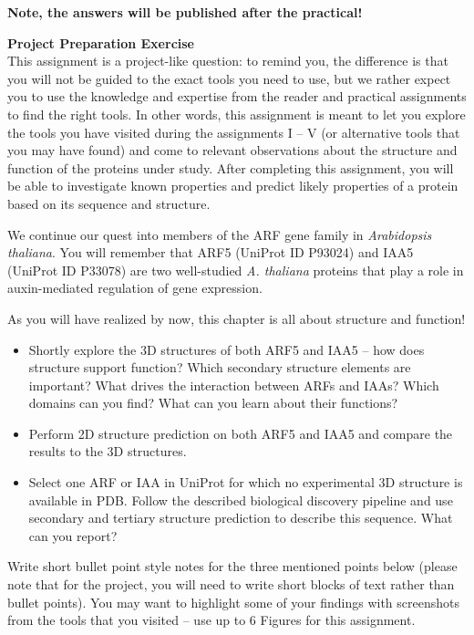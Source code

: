 \textbf{Note, the answers will be published after the practical!}

\begin{framed}
\textbf{\textbf{Project Preparation Exercise}}\\
This assignment is a project-like question: to remind you, the difference is that you will not be guided to the exact tools you need to use, but we rather expect you to use the knowledge and expertise from the reader and practical assignments to find the right tools.
In other words, this assignment is meant to let you explore the tools you have visited during the assignments I -- V (or alternative tools that you may have found) and come to relevant observations about the structure and function of the proteins under study.
After completing this assignment, you will be able to investigate known properties and predict likely properties of a protein based on its sequence and structure.

We continue our quest into members of the ARF gene family in \textit{Arabidopsis thaliana}.
You will remember that ARF5 (UniProt ID P93024) and IAA5 (UniProt ID P33078) are two well-studied \textit{A. thaliana} proteins that play a role in auxin-mediated regulation of gene expression.

As you will have realized by now, this chapter is all about structure and function!

\begin{itemize}
\item Shortly explore the 3D structures of both ARF5 and IAA5 -- how does structure support function? Which secondary structure elements are important? What drives the interaction between ARFs and IAAs? Which domains can you find? What can you learn about their functions?
\item Perform 2D structure prediction on both ARF5 and IAA5 and compare the results to the 3D structures.
\item Select one ARF or IAA in UniProt for which no experimental 3D structure is available in PDB. Follow the described biological discovery pipeline and use secondary and tertiary structure prediction to describe this sequence. What can you report?
\end{itemize}

Write short bullet point style notes for the three mentioned points below (please note that for the project, you will need to write short blocks of text rather than bullet points).
You may want to highlight some of your findings with screenshots from the tools that you visited -- use up to 6 Figures for this assignment.


\end{framed}
